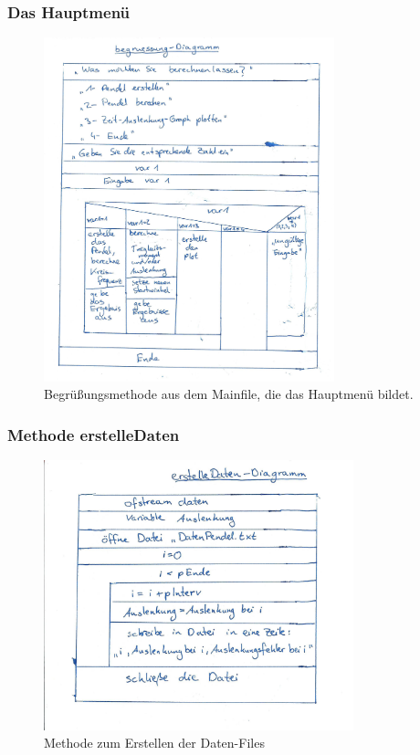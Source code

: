 \documentclass[11pt]{beamer}
\begin{document}
\begin{frame}
\frametitle{Das Hauptmenü}
\begin{figure} [H]
\centering
\includegraphics[width=0.75\textwidth]{info_2.jpg}
\caption{Begrüßungsmethode aus dem Mainfile, die das Hauptmenü bildet.}
\end{figure}
\end{frame}

\begin{frame}
\frametitle{Methode erstelleDaten}
\begin{figure} [H]
\centering
\includegraphics[width=0.8\textwidth]{info_3.jpg}
\caption{Methode zum Erstellen der Daten-Files}
\end{figure}
\end{frame}
\end{document}
